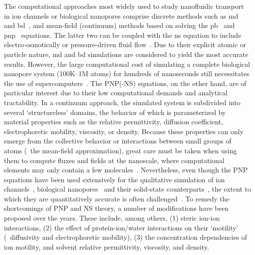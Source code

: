 The computational approaches most widely used to study nanofluidic transport in ion channels or biological
nanopores comprise discrete methods such as \gls{md}~\cite{Lynden-Bell-1996,Allen-1999,
Aksimentiev-2005,Luan-2008,Bhattacharya-2011,Zhang-2014,DiMarino-2015,Belkin-2016,Basdevant-2019,Cao-2019} and
\gls{bd}~\cite{Schirmer-1999,Im-2002,Noskov-2004,Millar-2008,Egwolf-2010,DeBiase-2015,Pederson-2015}, and
mean-field (continuum) methods based on solving the \gls{pb}~\cite{Grochowski-2008, Baldessari-2008-1} and
\gls{pnp}~\cite{Eisenberg-1996,Gillespie-2002,Simakov-2010} equations. The latter two can be coupled with the
\gls{ns} equation to include electro-osmotically or pressure-driven fluid flow~\cite{Lu-2012,Pederson-2015}.
Due to their explicit atomic or particle nature, \gls{md} and \gls{bd} simulations are considered to yield the
most accurate results. However, the large computational cost of simulating a complete biological nanopore
system (100K--1M atoms) for hundreds of nanoseconds still necessitates the use of
supercomputers~\cite{Aksimentiev-2005,Bhattacharya-2011,Wilson-2019,Cao-2019}. The PNP(-NS) equations, on the
other hand, are of particular interest due to their low computational demands and analytical tractability. In
a continuum approach, the simulated system is subdivided into several `structureless' domains, the behavior of
which is parameterized by material properties such as the relative permittivity, diffusion coefficient,
electrophoretic mobility, viscosity, or density. Because these properties can only emerge from the collective
behavior or interactions between small groups of atoms (\ie~the mean-field approximation), great care must be
taken when using them to compute fluxes and fields at the nanoscale, where computational elements may only
contain a few molecules~\cite{Corry-2000,Collins-2012}. Nevertheless, even though the PNP equations have been
used extensively for the qualitative simulation of ion channels~\cite{Im-2002,Furini-2006,Liu-2015},
biological nanopores~\cite{Simakov-2010,Pederson-2015, Aguilella-Arzo-2017,Simakov-2018} and their solid-state
counterparts~\cite{Cervera-2005,White-2008, Chaudhry-2014,Laohakunakorn-2015}, the extent to which they are
quantitatively accurate is often challenged~\cite{Corry-2000,Collins-2012,Maffeo-2012,Thomas-2014,Kim-2015}.
To remedy the shortcomings of PNP and NS theory, a number of modifications have been proposed over the years.
These include, among others, (1) steric ion-ion interactions, (2) the effect of protein-ion/water interactions
on their `motility' (\ie~diffusivity and electrophoretic mobility), (3) the concentration dependencies of ion
motility, and solvent relative permittivity, viscosity, and density.

